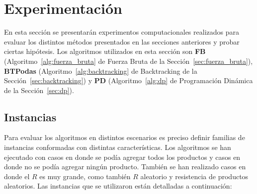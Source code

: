 \documentclass[10pt,a4paper]{article}
\begin{document}
\section{Experimentación} \label{sec:experimentacion}
En esta sección se presentarán experimentos computacionales realizados para evaluar los distintos métodos presentados en las secciones anteriores y probar ciertas hipótesis. Los algoritmos utilizados en esta sección son \textbf{FB} (Algoritmo~\ref{alg:fuerza_bruta} de Fuerza Bruta de la Sección~\ref{sec:fuerza_bruta}), \textbf{BTPodas} (Algoritmo~\ref{alg:backtracking} de Backtracking de la Sección~\ref{sec:backtracking}) y \textbf{PD} (Algoritmo~\ref{alg:dp} de Programación Dinámica de la Sección~\ref{sec:dp}).

\subsection{Instancias}
Para evaluar los algoritmos en distintos escenarios es preciso definir familias de instancias conformadas con distintas características. Los algoritmos se han ejecutado con casos en donde se pod\'ia agregar todos los productos y casos en donde no se pod\'ia agregar ning\'un producto. Tambi\'en se han realizado casos en donde el $R$ es muy grande, como tambi\'en $R$ aleatorio y resistencia de productos aleatorios. Las instancias que se utilizaron están detalladas a continuación:
\end{document}
